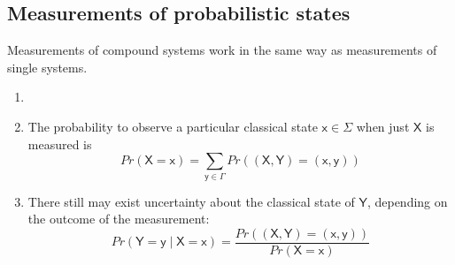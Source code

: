 
\newpage

\subsection{Measurements of probabilistic states}
Measurements of compound systems work in the same way as measurements of single systems.


\begin{sol}
    \begin{enumerate}
        \item[]
        \item The probability to observe a particular classical state $\mathsf{x}\in\Sigma$ when just $\mathsf{X}$ is measured is
        \begin{equation*}
            Pr(\mathsf{X}=\mathsf{x})=\sum\limits_{\mathsf{y}\in\Gamma}Pr((\mathsf{X},\mathsf{Y})=(\mathsf{x},\mathsf{y}))
        \end{equation*}
        \item There still may exist uncertainty about the classical state of $\mathsf{Y}$, depending on the outcome of the measurement:
        \begin{equation*}
            Pr(\mathsf{Y}=\mathsf{y}\mid \mathsf{X}=\mathsf{x})=\dfrac{Pr((\mathsf{X},\mathsf{Y})=(\mathsf{x},\mathsf{y}))}{Pr(\mathsf{X}=\mathsf{x})}
        \end{equation*}
    \end{enumerate}
\end{sol}

